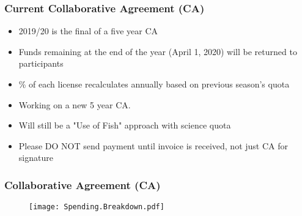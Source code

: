 \documentclass{beamer}
\begin{document}
	\begin{frame}
		
		\frametitle{Current Collaborative Agreement (CA)}
		
		\vspace*{-0.5cm}
		\begin{block}
			
			\begin{itemize}
				\item 2019/20 is the final of a five year CA
				\item Funds remaining at the end of the year (April 1, 2020) will be returned to participants
				\item \% of each license recalculates annually based on previous season's quota
				\item Working on a new 5 year CA.
				\item Will still be a "Use of Fish" approach with science quota
				\item Please DO NOT send payment until invoice is received, not just CA for signature
				
			\end{itemize}
		\end{block}
		
		
	\end{frame}
	
	
	
	\begin{frame}
		
		\frametitle{Collaborative Agreement (CA)}
		
		\begin{figure}
			
			\vspace*{-0.5cm}
			\centerline{\texttt{[image: Spending.Breakdown.pdf]}}
			
		\end{figure}
	\end{frame}
	
	
\end{document}
